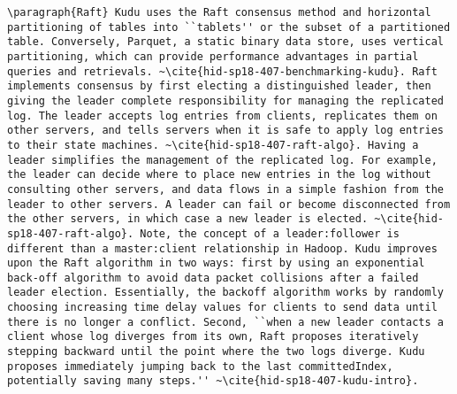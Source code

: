 \begin{tiny}
\begin{verbatim}
\paragraph{Raft} Kudu uses the Raft consensus method and horizontal partitioning of tables into ``tablets'' or the subset of a partitioned table. Conversely, Parquet, a static binary data store, uses vertical partitioning, which can provide performance advantages in partial queries and retrievals. ~\cite{hid-sp18-407-benchmarking-kudu}. Raft implements consensus by first electing a distinguished leader, then giving the leader complete responsibility for managing the replicated log. The leader accepts log entries from clients, replicates them on other servers, and tells servers when it is safe to apply log entries to their state machines. ~\cite{hid-sp18-407-raft-algo}. Having a leader simplifies the management of the replicated log. For example, the leader can decide where to place new entries in the log without consulting other servers, and data flows in a simple fashion from the leader to other servers. A leader can fail or become disconnected from the other servers, in which case a new leader is elected. ~\cite{hid-sp18-407-raft-algo}. Note, the concept of a leader:follower is different than a master:client relationship in Hadoop. Kudu improves upon the Raft algorithm in two ways: first by using an exponential back-off algorithm to avoid data packet collisions after a failed leader election. Essentially, the backoff algorithm works by randomly choosing increasing time delay values for clients to send data until there is no longer a conflict. Second, ``when a new leader contacts a client whose log diverges from its own, Raft proposes iteratively stepping backward until the point where the two logs diverge. Kudu proposes immediately jumping back to the last committedIndex, potentially saving many steps.'' ~\cite{hid-sp18-407-kudu-intro}.  

\end{verbatim}
\end{tiny}
